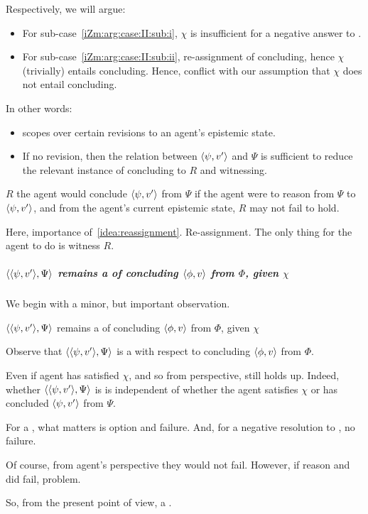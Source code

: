 \begin{note}
  Respectively, we will argue:
  \begin{itemize}
  \item
    For sub-case~\ref{iZm:arg:case:II:sub:i}, \(\chi\) is insufficient for a negative answer to \qzS{}.
  \item
    For sub-case~\ref{iZm:arg:case:II:sub:ii}, re-assignment of concluding, hence \(\chi\) (trivially) entails concluding. Hence, conflict with our assumption that \(\chi\) does not entail concluding.
  \end{itemize}

  In other words:
  \begin{itemize}
  \item
    \qzS{} scopes over certain revisions to an agent's epistemic state.
  \item
    If no revision, then the relation between \(\langle \psi, v' \rangle\) and \(\Psi\) is sufficient to reduce the relevant instance of concluding to \(R\) and witnessing.
  \end{itemize}

  \(R\) the agent would conclude \(\langle \psi, v' \rangle\) from \(\Psi\) if the agent were to reason from \(\Psi\) to \(\langle \psi, v' \rangle\), and from the agent's current epistemic state, \(R\) may not fail to hold.

  Here, importance of~\ref{idea:reassignment}.
  Re-assignment.
  The only thing for the agent to do is witness \(R\).
\end{note}

\subparagraph*{\(\langle \langle \psi, v' \rangle, \Psi \rangle\) remains a  of concluding \(\langle \phi, v \rangle\) from \(\Phi\), given \(\chi\)}

\begin{note}
  We begin with a minor, but important observation.

  \begin{proposition}
    \(\langle \langle \psi, v' \rangle, \Psi \rangle\) remains a  of concluding \(\langle \phi, v \rangle\) from \(\Phi\), given \(\chi\)
  \end{proposition}
\end{note}

\begin{note}
  Observe that \(\langle \langle \psi, v' \rangle, \Psi \rangle\) is a \requ{} with respect to concluding \(\langle \phi, v \rangle\) from \(\Phi\).

  Even if agent has satisfied \(\chi\), and so from perspective, still holds up.
  Indeed, whether \(\langle \langle \psi, v' \rangle, \Psi \rangle\) is \requ{} is independent of whether the agent satisfies \(\chi\) or has concluded \(\langle \psi, v' \rangle\) from \(\Psi\).

  For a \requ{}, what matters is option and failure.
  And, for a negative resolution to \qzS{}, no failure.

  Of course, from agent's perspective they would not fail.
  However, if reason and did fail, problem.

  So, from the present point of view, a \requ{}.
\end{note}

